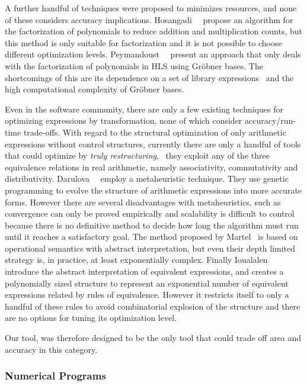 A further handful of techniques were proposed to minimizes resources, and none
of these considers accuracy implications.  Hosangadi~\etal~\cite{hosangadi}
propose an algorithm for the factorization of polynomials to reduce
addition and multiplication counts, but this method is only suitable for
factorization and it is not possible to choose different optimization
levels. Peymandoust~\etal~\cite{peymandoust} present an approach that
only deals with the factorization of polynomials in HLS using Gr\"obner
bases. The shortcomings of this are its dependence on a set of library
expressions~\cite{hosangadi} and the high computational complexity of Gr\"obner
bases.

Even in the software community, there are only a few existing techniques
for optimizing expressions by transformation, none of which consider
accuracy/run-time trade-offs.  With regard to the structural optimization
of only arithmetic expressions without control structures, currently
there are only a handful of tools that could optimize by \emph{truly
restructuring}, \ie~they exploit any of the three equivalence relations in
real arithmetic, namely associativity, commutativity and distributivity.
Darulova~\etal~\cite{darulova} employ a metaheuristic technique. They use
genetic programming to evolve the structure of arithmetic expressions into more
accurate forms. However there are several disadvantages with metaheuristics,
such as convergence can only be proved empirically and scalability is difficult
to control because there is no definitive method to decide how long the
algorithm must run until it reaches a satisfactory goal. The method proposed
by Martel~\cite{martel07} is based on operational semantics with abstract
interpretation, but even their depth limited strategy is, in practice, at least
exponentially complex.  Finally Ioualalen~\etal~\cite{ioualalen} introduce the
abstract interpretation of equivalent expressions, and creates a polynomially
sized structure to represent an exponential number of equivalent expressions
related by rules of equivalence. However it restricts itself to only a handful
of these rules to avoid combinatorial explosion of the structure and there are
no options for tuning its optimization level.

Our tool, \soap{} was therefore designed to be the only tool that could trade
off area and accuracy in this category.


\subsubsection{Numerical Programs}
\label{bg:ssub:numerical_programs}

